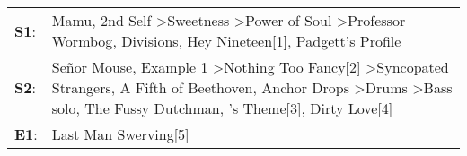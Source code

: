 \begin{supertabular}{p{0.03\textwidth}p{0.92\textwidth}}
 \textbf{S1}:  &                                                                                                                                                               Mamu\textsuperscript{}, \enspace 2nd Self\textsuperscript{} \textgreater \enspace Sweetness\textsuperscript{} \textgreater \enspace Power of Soul\textsuperscript{} \textgreater \enspace Professor Wormbog\textsuperscript{}, \enspace Divisions\textsuperscript{}, \enspace Hey Nineteen[1]\textsuperscript{}, \enspace Padgett's Profile\textsuperscript{}  \enspace  \\
 \textbf{S2}:  &  Señor Mouse\textsuperscript{}, \enspace Example 1\textsuperscript{} \textgreater \enspace Nothing Too Fancy[2]\textsuperscript{} \textgreater \enspace Syncopated Strangers\textsuperscript{}, \enspace A Fifth of Beethoven\textsuperscript{}, \enspace Anchor Drops\textsuperscript{} \textgreater \enspace Drums\textsuperscript{} \textgreater \enspace Bass solo\textsuperscript{}, \enspace The Fussy Dutchman\textsuperscript{}, 's Theme[3]\textsuperscript{}, \enspace Dirty Love[4]\textsuperscript{}  \enspace  \\
 \textbf{E1}:  &                                                                                                                                                                                                                                                                                                                                                                                                                                                                                      Last Man Swerving[5]\textsuperscript{}  \enspace  \\
\end{supertabular}
